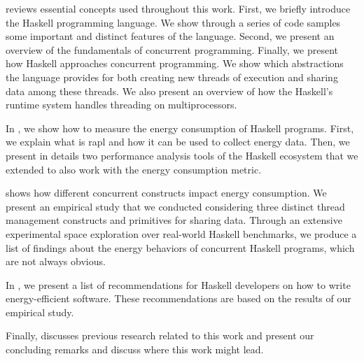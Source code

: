 \textbf{} reviews essential concepts used throughout this work. First, we briefly introduce the Haskell programming language. We show through a series of code samples some important and distinct features of the language. Second, we present an overview of the fundamentals of concurrent programming. Finally, we present how Haskell approaches concurrent programming. We show which abstractions the language provides for both creating new threads of execution and sharing data among these threads. We also present an overview of how the Haskell's runtime system handles threading on multiprocessors.

In \textbf{}, we show how to measure the energy consumption of Haskell programs. First, we explain what is \acs{rapl} and how it can be used to collect energy data. Then, we present in details two performance analysis tools of the Haskell ecosystem that we extended to also work with the energy consumption metric.

\textbf{} shows how different concurrent constructs impact energy consumption. We present an empirical study that we conducted considering three distinct thread management constructs and primitives for sharing data. Through an extensive experimental space exploration over real-world Haskell benchmarks, we produce a list of findings about the energy behaviors of concurrent Haskell programs, which are not always obvious.

In \textbf{}, we present a list of recommendations for Haskell developers on how to write energy-efficient software. These recommendations are based on the results of our empirical study.

Finally, \textbf{} discusses previous research related to this work and \textbf{} present our concluding remarks and discuss where this work might lead.

